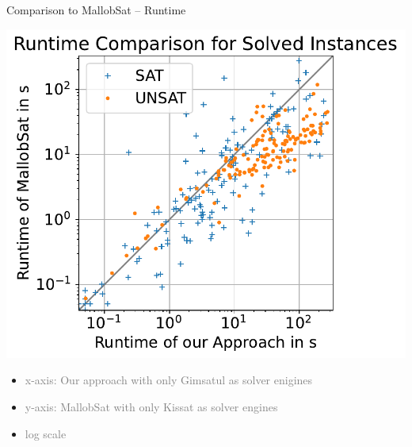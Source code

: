 \documentclass[]{sdqbeamer}
\begin{document}
\begin{frame}{Comparison to MallobSat -- Runtime}
    \begin{minipage}{.45\textwidth}
        \center
        \includegraphics[scale=.8]{plots/square_runtime_compare/square_runtime_16node.pdf}\\
    \end{minipage}
    \hfill
    \begin{minipage}{.45\textwidth}
        \begin{itemize}
            \item \textcolor{gray}{x-axis: Our approach with only Gimsatul as solver enigines}
            \item \textcolor{gray}{y-axis: MallobSat with only Kissat as solver engines}
            \item \textcolor{gray}{log scale}
        \end{itemize}
    \end{minipage}
\end{frame}
\end{document}
